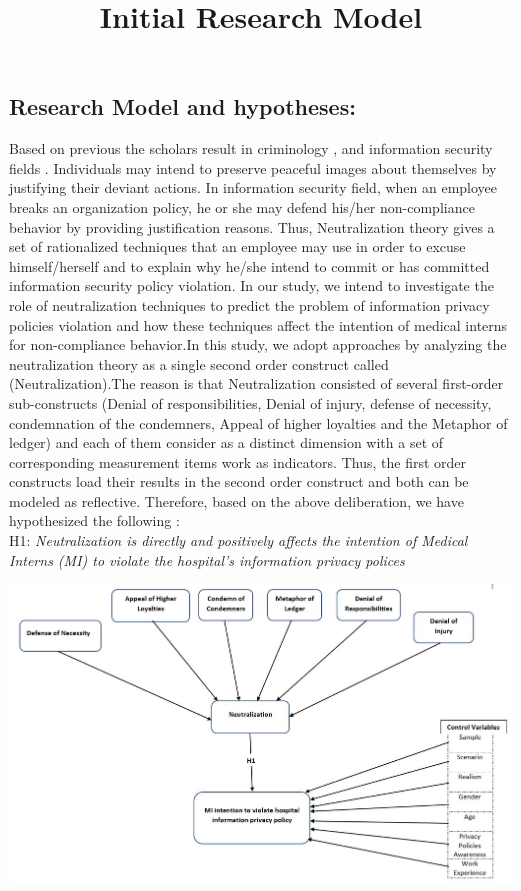 \subsection{Research Model and hypotheses:}
Based on previous the scholars result in criminology \cite{Sykes1957}, and information security fields \cite{Siponen2010,Teh2015,Kim2014}. Individuals may intend to preserve peaceful images about themselves by justifying their deviant actions\cite{Kim2014}. In information security field, when an employee breaks an organization policy, he or she may defend his/her non-compliance behavior by providing justification reasons. Thus, Neutralization theory gives a set of rationalized techniques that an employee may use in order to excuse himself/herself and to explain why he/she intend to commit or has committed information security policy violation. In our study, we intend to investigate the role of neutralization techniques to predict the problem of information privacy policies violation and how these techniques affect the intention of medical interns for non-compliance behavior.In this study, we adopt \cite{Siponen2010,Teh2015} approaches by analyzing the neutralization theory as a single second order construct called (Neutralization).The reason is that Neutralization consisted of several first-order sub-constructs (Denial of responsibilities, Denial of injury, defense of necessity, condemnation of the condemners, Appeal of higher loyalties and the Metaphor of ledger) and each of them consider as a distinct dimension with a set of corresponding measurement items work as indicators. Thus, the first order constructs load their results in the second order construct and both can be modeled as reflective. 
Therefore, based on the above deliberation, we have hypothesized the following :\\H1: \textit{Neutralization is directly and positively affects the intention of Medical Interns (MI) to violate the hospital's information privacy polices   \textbf{}} 

\graphicspath{ {image/} }
\begin{center}
\includegraphics [scale=0.4]{Research_Model_Fv.JPG}
\end{center}
\begin{center}
\title{ Initial Research Model}
\end{center}

